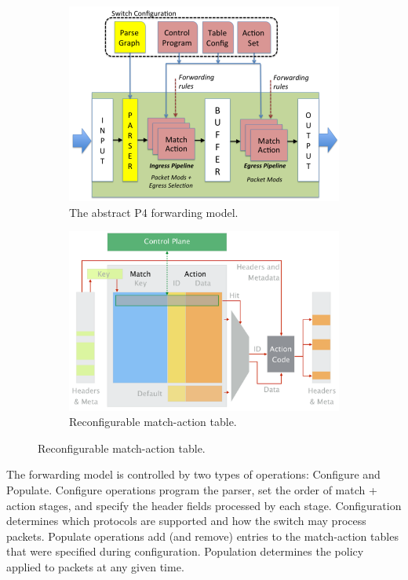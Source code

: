 \documentclass[11pt,oneside,a4paper]{article}
\begin{document}
\begin{figure}[hb]
	\centering
	\begin{subfigure}[t]{.5\textwidth}
		\centering
		\includegraphics[width=\linewidth]{figures/forwarding_model}
		\caption{The abstract P4 forwarding model. \cite{bosshart2014p4}}
		\label{fig:forwarding_models}
	\end{subfigure}%
	\begin{subfigure}[t]{.5\textwidth}
		\centering
		\includegraphics[width=\linewidth]{figures/match_action_tables}
		\caption{Reconfigurable match-action table. \cite{advnet}}
		\label{fig:match_action_tables}
	\end{subfigure}
\end{figure}

\newpage

\noindent The forwarding model is controlled by two types of operations: Configure and Populate. Configure operations program the parser, set the order of match + action stages, and specify the header fields processed by each stage. Configuration determines which protocols are supported and how the switch may process packets. Populate operations add (and remove) entries to the match-action tables that were specified during configuration. Population determines the policy applied to packets at any given time.
\end{document}
